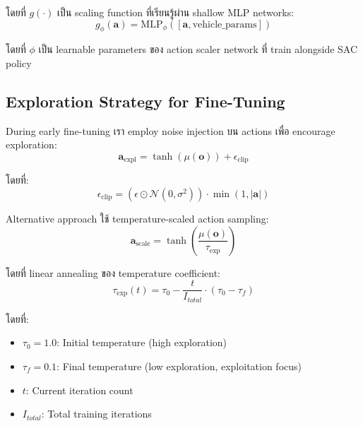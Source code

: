 \documentclass[10pt,a4paper,twocolumn]{article}
\begin{document}
โดยที่ $g(\cdot)$ เป็น scaling function ที่เรียนรู้ผ่าน shallow MLP networks:
\begin{equation}\label{eq:action-scaling-MLP}
    g_\phi(\mathbf{a}) = \text{MLP}_\phi([\mathbf{a}, \text{vehicle\_params}])
\end{equation}

โดยที่ $\phi$ เป็น learnable parameters ของ action scaler network ที่ train alongside SAC policy

\subsection{Exploration Strategy for Fine-Tuning}

During early fine-tuning เรา employ noise injection บน actions เพื่อ encourage exploration:
\begin{equation}\label{eq:noise-injection}
    \mathbf{a}_{\text{expl}} = \tanh(\mu(\mathbf{o})) + \epsilon_{\text{clip}}
\end{equation}

โดยที่:
\begin{equation}\label{eq:clipped-noise}
    \epsilon_{\text{clip}} = (\epsilon \odot \mathcal{N}(0, \sigma^2)) \cdot \min(1, |\mathbf{a}|)
\end{equation}

Alternative approach ใช้ temperature-scaled action sampling:
\begin{equation}\label{eq:temperature-scaling}
    \mathbf{a}_{\text{scale}} = \tanh\left(\frac{\mu(\mathbf{o})}{\tau_{\text{exp}}}\right)
\end{equation}

โดยที่ linear annealing ของ temperature coefficient:
\begin{equation}\label{eq:temperature-anneling}
    \tau_{\text{exp}}(t) = \tau_0 - \frac{t}{I_{total}} \cdot (\tau_0 - \tau_f)
\end{equation}

โดยที่:
\begin{itemize}
    \item $\tau_0 = 1.0$: Initial temperature (high exploration)
    \item $\tau_f = 0.1$: Final temperature (low exploration, exploitation focus)
    \item $t$: Current iteration count
    \item $I_{total}$: Total training iterations
\end{itemize}
\end{document}
